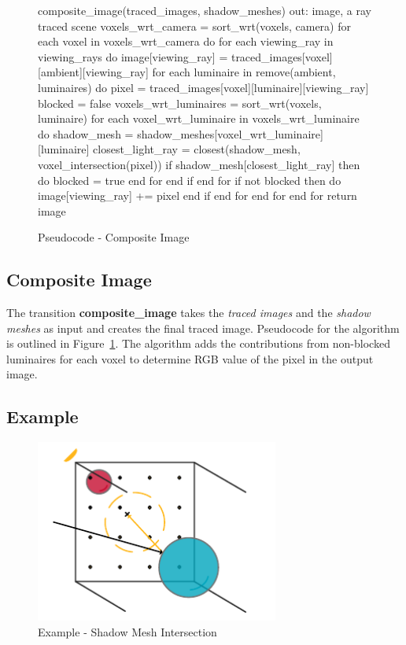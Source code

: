 \begin{figure}[!htb]
\begin{algorithm}
composite_image(traced_images, shadow_meshes)
  out: image, a ray traced scene
  voxels_wrt_camera = sort_wrt(voxels, camera)
  for each voxel in voxels_wrt_camera do
    for each viewing_ray in viewing_rays do
      image[viewing_ray] = traced_images[voxel][ambient][viewing_ray]
      for each luminaire in remove(ambient, luminaires) do 
        pixel = traced_images[voxel][luminaire][viewing_ray]
        blocked = false  
        voxels_wrt_luminaires = sort_wrt(voxels, luminaire)  
        for each voxel_wrt_luminaire in voxels_wrt_luminaire do
          shadow_mesh = shadow_meshes[voxel_wrt_luminaire][luminaire]
          closest_light_ray = closest(shadow_mesh, voxel_intersection(pixel)) 
          if shadow_mesh[closest_light_ray] then do 
            blocked = true
            end for
          end if
        end for
        if not blocked then do 
          image[viewing_ray] += pixel
        end if
      end for
    end for
  end for
return image
\end{algorithm}
\caption{Pseudocode - Composite Image}
\label{fig:composite-image}
\end{figure}

\subsection{Composite Image}
The transition \textbf{composite\_image} takes the \emph{traced images} and the 
\emph{shadow meshes} as input and creates the final traced image.  Pseudocode
for the algorithm is outlined in Figure~\ref{fig:composite-image}.  The
algorithm adds the contributions from non-blocked luminaires for each voxel to 
determine RGB value of the pixel in the output image.  

\subsection{Example}

\begin{figure}[!h]
  \centering
  \includegraphics[width=8cm]{drawings/examples/LightIntersection.pdf}
  \caption{Example - Shadow Mesh Intersection}
  \label{fig:light-mesh-intersection}
\end{figure}

